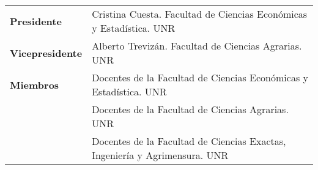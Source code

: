 \documentclass[12pt,twoside,a4paper]{article}
\begin{document}
\begin{table}[h]
\begin{tabular}{p{2.5cm}p{12cm}}
\textbf{Presidente}     & Cristina Cuesta. Facultad de Ciencias Económicas y Estadística. UNR        \\
\textbf{Vicepresidente} & Alberto Trevizán. Facultad de Ciencias Agrarias. UNR                       \\
\textbf{Miembros}       & Docentes de la Facultad de Ciencias Económicas y Estadística. UNR          \\
\textbf{}               & Docentes de la Facultad de Ciencias Agrarias. UNR                          \\
                        & Docentes de la Facultad de Ciencias Exactas, Ingeniería y Agrimensura. UNR
\end{tabular}
\end{table}

\vspace{0.5cm}

{}
\bigbreak
\end{document}
